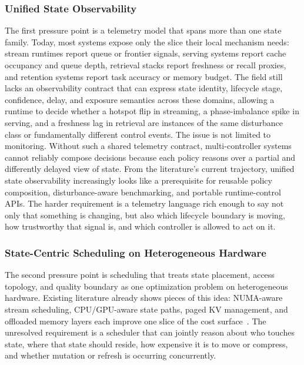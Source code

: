 \documentclass[acmsmall,screen,review]{acmart}
\begin{document}
\subsubsection{Unified State Observability}

The first pressure point is a telemetry model that spans more than one state family. Today, most systems expose only the slice their local mechanism needs: stream runtimes report queue or frontier signals, serving systems report cache occupancy and queue depth, retrieval stacks report freshness or recall proxies, and retention systems report task accuracy or memory budget. The field still lacks an observability contract that can express state identity, lifecycle stage, confidence, delay, and exposure semantics across these domains, allowing a runtime to decide whether a hotspot flip in streaming, a phase-imbalance spike in serving, and a freshness lag in retrieval are instances of the same disturbance class or fundamentally different control events. The issue is not limited to monitoring. Without such a shared telemetry contract, multi-controller systems cannot reliably compose decisions because each policy reasons over a partial and differently delayed view of state. From the literature's current trajectory, unified state observability increasingly looks like a prerequisite for reusable policy composition, disturbance-aware benchmarking, and portable runtime-control APIs. The harder requirement is a telemetry language rich enough to say not only that something is changing, but also which lifecycle boundary is moving, how trustworthy that signal is, and which controller is allowed to act on it.

\subsubsection{State-Centric Scheduling on Heterogeneous Hardware}

The second pressure point is scheduling that treats state placement, access topology, and quality boundary as one optimization problem on heterogeneous hardware. Existing literature already shows pieces of this idea: NUMA-aware stream scheduling, CPU/GPU-aware state paths, paged KV management, and offloaded memory layers each improve one slice of the cost surface~\cite{zhang2019briskstream,zhang2020finestream,kwon2023pagedattention,sheng2023flexgen}. The unresolved requirement is a scheduler that can jointly reason about who touches state, where that state should reside, how expensive it is to move or compress, and whether mutation or refresh is occurring concurrently.
\end{document}
